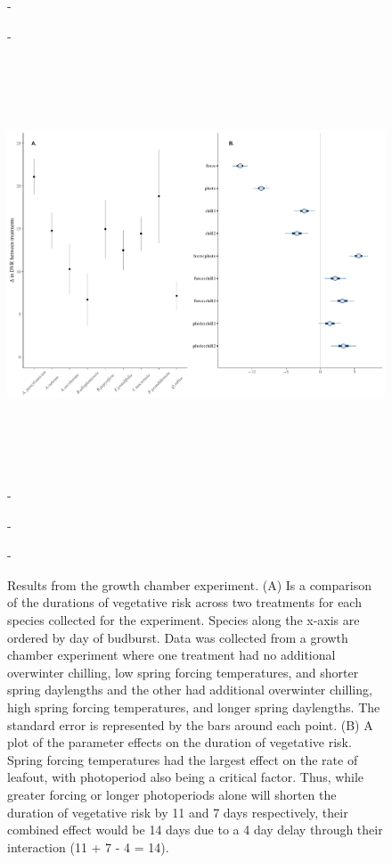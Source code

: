 \documentclass{article}\usepackage[]{graphicx}\usepackage[]{color}
\begin{document}
\begin{figure} [H] 
 -\begin{center}
 -\includegraphics[width=16cm, height=13cm]{..//figure/DVRdiff_twoplots.pdf} 
 -\caption{Results from the growth chamber experiment. (A) Is a comparison of the durations of vegetative risk across two treatments for each species collected for the experiment. Species along the x-axis are ordered by day of budburst. Data was collected from a growth chamber experiment where one treatment had no additional overwinter chilling, low spring forcing temperatures, and shorter spring daylengths and the other had additional overwinter chilling, high spring forcing temperatures, and longer spring daylengths. The standard error is represented by the bars around each point. (B) A plot of the parameter effects on the duration of vegetative risk. Spring forcing temperatures had the largest effect on the rate of leafout, with photoperiod also being a critical factor. Thus, while greater forcing or longer photoperiods alone will shorten the duration of vegetative risk by 11 and 7 days respectively, their combined effect would be 14 days due to a 4 day delay through their interaction (11 + 7 - 4 = 14). }\label{fig:dan} 
 -\end{center}
 -\end{figure}
 
\end{document}
